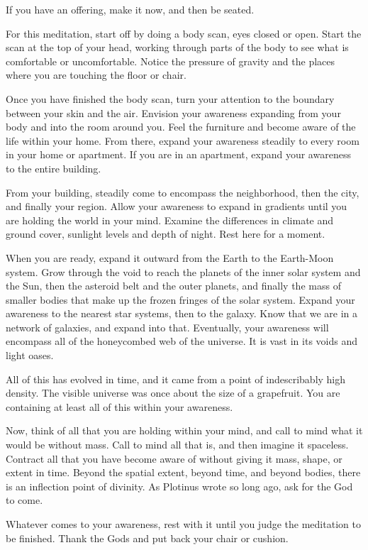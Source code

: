 \documentclass[
]{book}
\begin{document}
If you have an offering, make it now, and then be seated.

For this meditation, start off by doing a body scan, eyes closed or open. Start the scan at the top of your head, working through parts of the body to see what is comfortable or uncomfortable. Notice the pressure of gravity and the places where you are touching the floor or chair.

Once you have finished the body scan, turn your attention to the boundary between your skin and the air. Envision your awareness expanding from your body and into the room around you. Feel the furniture and become aware of the life within your home. From there, expand your awareness steadily to every room in your home or apartment. If you are in an apartment, expand your awareness to the entire building.

From your building, steadily come to encompass the neighborhood, then the city, and finally your region. Allow your awareness to expand in gradients until you are holding the world in your mind. Examine the differences in climate and ground cover, sunlight levels and depth of night. Rest here for a moment.

When you are ready, expand it outward from the Earth to the Earth-Moon system. Grow through the void to reach the planets of the inner solar system and the Sun, then the asteroid belt and the outer planets, and finally the mass of smaller bodies that make up the frozen fringes of the solar system. Expand your awareness to the nearest star systems, then to the galaxy. Know that we are in a network of galaxies, and expand into that. Eventually, your awareness will encompass all of the honeycombed web of the universe. It is vast in its voids and light oases.

All of this has evolved in time, and it came from a point of indescribably high density. The visible universe was once about the size of a grapefruit. You are containing at least all of this within your awareness.

Now, think of all that you are holding within your mind, and call to mind what it would be without mass. Call to mind all that is, and then imagine it spaceless. Contract all that you have become aware of without giving it mass, shape, or extent in time. Beyond the spatial extent, beyond time, and beyond bodies, there is an inflection point of divinity. As Plotinus wrote so long ago, ask for the God to come.

Whatever comes to your awareness, rest with it until you judge the meditation to be finished. Thank the Gods and put back your chair or cushion.
\end{document}
